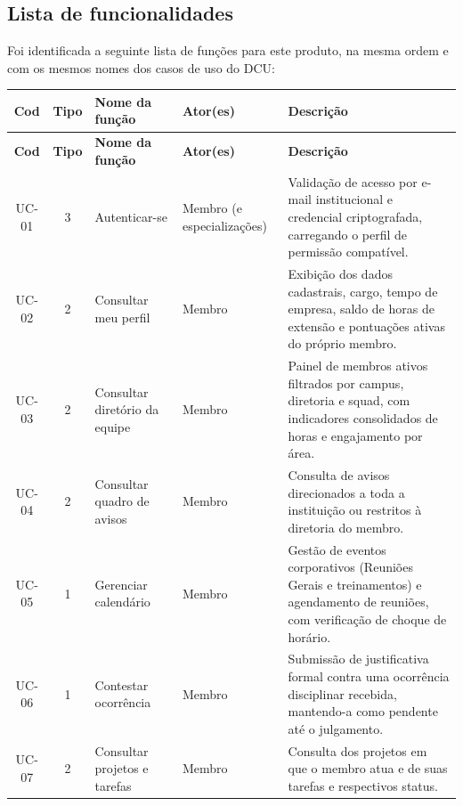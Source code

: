 \subsection{Lista de funcionalidades}

Foi identificada a seguinte lista de funções para este produto, na mesma ordem e com os mesmos nomes dos casos de uso do DCU:

\begin{center}
\footnotesize
\begin{longtable}{|c|c|p{2.9cm}|p{2.4cm}|p{5.3cm}|}
\hline
\textbf{Cod} & \textbf{Tipo} & \textbf{Nome da função} & \textbf{Ator(es)} & \textbf{Descrição} \\
\hline
\endfirsthead
\hline
\textbf{Cod} & \textbf{Tipo} & \textbf{Nome da função} & \textbf{Ator(es)} & \textbf{Descrição} \\
\hline
\endhead

UC-01 & 3 & Autenticar-se & Membro (e especializações) & Validação de acesso por e-mail institucional e credencial criptografada, carregando o perfil de permissão compatível. \\
\hline

UC-02 & 2 & Consultar meu perfil & Membro & Exibição dos dados cadastrais, cargo, tempo de empresa, saldo de horas de extensão e pontuações ativas do próprio membro. \\
\hline

UC-03 & 2 & Consultar diretório da equipe & Membro & Painel de membros ativos filtrados por campus, diretoria e squad, com indicadores consolidados de horas e engajamento por área. \\
\hline

UC-04 & 2 & Consultar quadro de avisos & Membro & Consulta de avisos direcionados a toda a instituição ou restritos à diretoria do membro. \\
\hline

UC-05 & 1 & Gerenciar calendário & Membro & Gestão de eventos corporativos (Reuniões Gerais e treinamentos) e agendamento de reuniões, com verificação de choque de horário. \\
\hline

UC-06 & 1 & Contestar ocorrência & Membro & Submissão de justificativa formal contra uma ocorrência disciplinar recebida, mantendo-a como pendente até o julgamento. \\
\hline

UC-07 & 2 & Consultar projetos e tarefas & Membro & Consulta dos projetos em que o membro atua e de suas tarefas e respectivos status. \\
\hline


\end{longtable}
\end{center}
